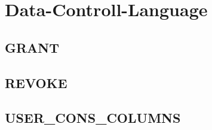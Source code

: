 \section[DCL]{Data-Controll-Language}
\label{sec:dcl}

\subsection{GRANT}
\label{sec:dcl.grant}

\subsection{REVOKE}
\label{sec:dcl.revoke}


\subsection{USER\_CONS\_COLUMNS}
\label{sec:dcl.user_cons_columns}
